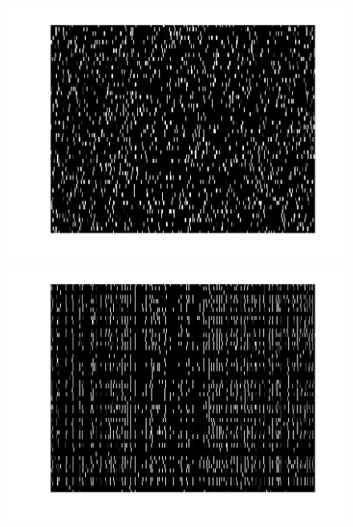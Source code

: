\begin{figure}[h]
\centering
\begin{minipage}[c]{0.45\hsize}
\includegraphics[width=\hsize]{../figs/Figure7b_raster_weak}
\end{minipage}
\begin{minipage}[c]{0.45\hsize}
\includegraphics[width=\hsize]{../figs/Figure7a_raster_strong}
\end{minipage}
\begin{minipage}[c]{0.45\hsize}

\end{minipage}
\end{figure}
